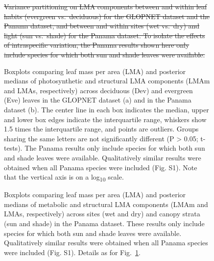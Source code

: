 \documentclass[
  12pt,
  letterpaper,
  DIV=11,
  numbers=noendperiod]{scrartcl}
\providecommand{\DIFdel}[1]{{\protect\color{red}\sout{#1}}}                      %
\providecommand{\DIFdelFL}[1]{\DIFdel{#1}} %
\providecommand{\DIFdelbeginFL}{} %
\providecommand{\DIFdelendFL}{} %
\newcommand{\DIFscaledelfig}{0.5}
\newlength{\DIFdelgraphicswidth} %
\newlength{\DIFdelgraphicsheight} %
\newcommand{\DIFdelincludegraphics}[2][]{%
\sbox{\DIFdelgraphicsbox}{\DIFOincludegraphics[#1]{#2}}%
\settoboxwidth{\DIFdelgraphicswidth}{\DIFdelgraphicsbox} %
\settoboxtotalheight{\DIFdelgraphicsheight}{\DIFdelgraphicsbox} %
\scalebox{\DIFscaledelfig}{%
\parbox[b]{\DIFdelgraphicswidth}{\usebox{\DIFdelgraphicsbox}\\[-\baselineskip] \rule{\DIFdelgraphicswidth}{0em}}\llap{\resizebox{\DIFdelgraphicswidth}{\DIFdelgraphicsheight}{%
\setlength{\unitlength}{\DIFdelgraphicswidth}%
\begin{picture}(1,1)%
\thicklines\linethickness{2pt} %
{\color[rgb]{1,0,0}\put(0,0){\framebox(1,1){}}}%
{\color[rgb]{1,0,0}\put(0,0){\line( 1,1){1}}}%
{\color[rgb]{1,0,0}\put(0,1){\line(1,-1){1}}}%
\end{picture}%
}\hspace*{3pt}}} %
} %
\DeclareRobustCommand{\DIFdelbeginFL}{\DIFOdelbeginFL \let\includegraphics\DIFdelincludegraphics} %
\DeclareRobustCommand{\DIFdelendFL}{\DIFOaddendFL \let\includegraphics\DIFOincludegraphics} %
\begin{document}
\newpage

\begin{figure}

\DIFdelbeginFL %



{%
\DIFdelFL{Variance partitioning on LMA components
between and within leaf habits (evergreen vs.~deciduous) for the GLOPNET
dataset and the Panama dataset, and between and within sites (wet
vs.~dry) and light (sun vs.~shade) for the Panama dataset. To isolate
the effects of intraspecific variation, the Panama results shown here
only include species for which both sun and shade leaves were
available.}}




\DIFdelendFL {}

\caption{\label{fig-box_de}Boxplots comparing leaf mass per area (LMA)
and posterior medians of photosynthetic and structural LMA components
(LMAm and LMAs, respectively) across deciduous (Dev) and evergreen (Eve)
leaves in the GLOPNET dataset (a) and in the Panama dataset (b). The
center line in each box indicates the median, upper and lower box edges
indicate the interquartile range, whiskers show 1.5 times the
interquartile range, and points are outliers. Groups sharing the same
letters are not significantly different (P \textgreater{} 0.05;
t-tests). The Panama results only include species for which both sun and
shade leaves were available. Qualitatively similar results were obtained
when all Panama species were included (Fig. S1). Note that the vertical
axis is on a log\textsubscript{10} scale.}

\end{figure}%

\newpage

\begin{figure}


\caption{\label{fig-box_pa}Boxplots comparing leaf mass per area (LMA)
and posterior medians of metabolic and structural LMA components (LMAm
and LMAs, respectively) across sites (wet and dry) and canopy strata
(sun and shade) in the Panama dataset. These results only include
species for which both sun and shade leaves were available.
Qualitatively similar results were obtained when all Panama species were
included (Fig. S1). Details as for Fig.~\ref{fig-box_de}.}

\end{figure}%
\end{document}

